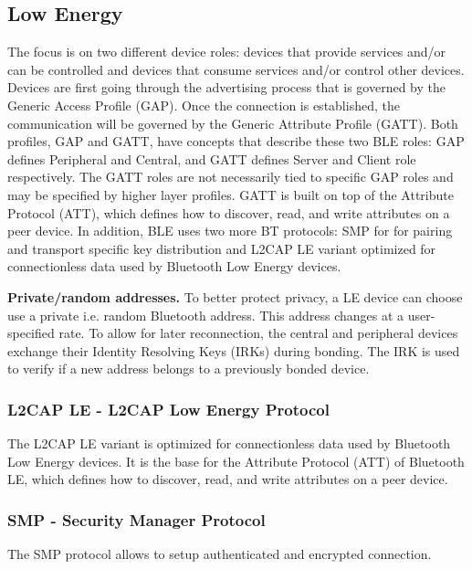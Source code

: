 \subsection{Low Energy}
The focus is on two different device roles:  devices that provide services and/or can be controlled and devices that consume services and/or control other devices. Devices are first going through the advertising process that is governed by the Generic Access Profile (GAP). Once the connection is established, the communication will be governed by the Generic Attribute Profile (GATT). Both profiles, GAP and GATT, have concepts that describe these two BLE roles:  GAP defines Peripheral and Central, and GATT defines Server and Client role respectively. The GATT roles are not necessarily tied to specific GAP roles and may be specified by higher layer profiles. GATT is built on top of the Attribute Protocol (ATT), which defines how to discover, read, and write attributes on a peer device. In addition, BLE uses two more BT protocols: SMP for for pairing and transport specific key distribution and L2CAP LE variant optimized for connectionless data used by Bluetooth Low Energy devices. 

\textbf{Private/random addresses.}
To better protect privacy, a LE device can choose use a private i.e. random Bluetooth address. This address changes at a user-specified rate. To allow for later reconnection, the central and peripheral devices exchange their Identity Resolving Keys (IRKs) during bonding. The IRK is used to verify if a new address belongs to a previously bonded device.

\subsubsection{L2CAP LE - L2CAP Low Energy Protocol}
The L2CAP LE variant is optimized for connectionless data used by Bluetooth Low Energy devices. It is the base for the Attribute Protocol (ATT) of Bluetooth LE, which defines how to discover, read, and write attributes on a peer device. %


\subsubsection{SMP - Security Manager Protocol }
The SMP protocol allows to setup authenticated and encrypted connection.

